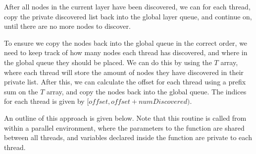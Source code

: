 \documentclass{article}
\begin{document}
After all nodes in the current layer have been discovered, we can for each thread, copy the private discovered list back into the global layer queue, and continue on, until there are no more nodes to discover.
\medskip

To ensure we copy the nodes back into the global queue in the correct order, we need to keep track of how many nodes each thread has discovered, and where in the global queue they should be placed. We can do this by using the \( T \) array, where each thread will store the amount of nodes they have discovered in their private list. After this, we can calculate the offset for each thread using a prefix sum on the \( T \) array, and copy the nodes back into the global queue. The indices for each thread is given by \( [\textit{offset}, \textit{offset} + \textit{numDiscovered})\).
\medskip

An outline of this approach is given below. Note that this routine is called from within a parallel environment, where the parameters to the function are shared between all threads, and variables declared inside the function are private to each thread.
\end{document}
